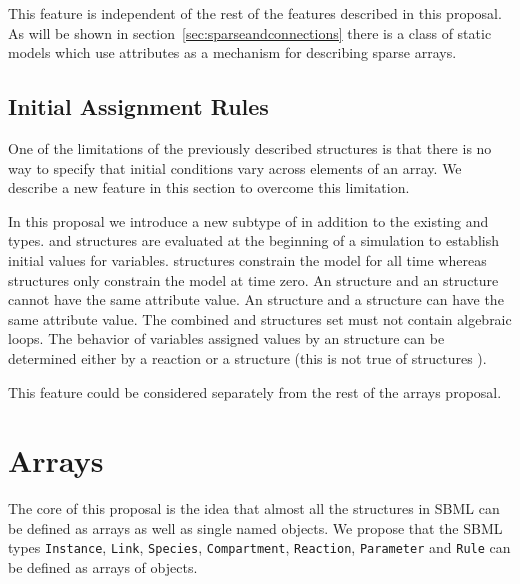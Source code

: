 \documentclass{cekarticle}
\begin{document}
This feature is independent of the rest of the features described in this proposal.
As will be shown in section~\ref{sec:sparseandconnections} there is a class of static models which use 
attributes as a mechanism for describing sparse arrays.

\subsection{Initial Assignment Rules}

One of the limitations of the previously described structures is that there is no way to 
specify that initial conditions vary across elements of an array.  We describe a new feature
in this section to overcome this limitation.

In this proposal we introduce a new subtype of   in addition
to the existing  and  types.  
 and  structures are evaluated at the beginning of a simulation to establish
initial values for variables.   structures constrain the model for all time
whereas  structures only constrain the model at time zero. 
An  structure and an  structure cannot have the same
 attribute value.  An  structure and a  structure can have the same
 attribute value.  The combined  and  structures
set must not contain algebraic loops.  The behavior of variables assigned values by an
 structure can be determined either by a reaction  or a  structure (this is not
true of  structures ).

This feature could be considered separately from the rest of the arrays proposal.

\section{Arrays}
\label{sec:arrays}

The core of this proposal is the idea that almost all the
structures in SBML can be defined as arrays as well as single
named objects.  We propose that the SBML types
\texttt{Instance}, \texttt{Link}, \texttt{Species}, \texttt{Compartment}, \texttt{Reaction},
\texttt{Parameter} and \texttt{Rule} can be defined as arrays of
objects. 
\end{document}
